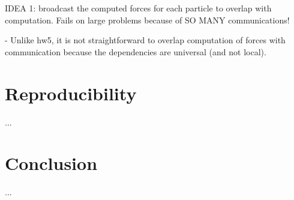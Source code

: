 \documentclass[10pt,journal,compsocconf]{IEEEtran}
\begin{document}
IDEA 1: broadcast the computed forces for each particle to overlap with computation.
Fails on large problems because of SO MANY communications!

- Unlike hw5, it is not straightforward to overlap computation of forces with communication
  because the dependencies are universal (and not local).


\section{Reproducibility}
...

\section{Conclusion}
...
\end{document}
